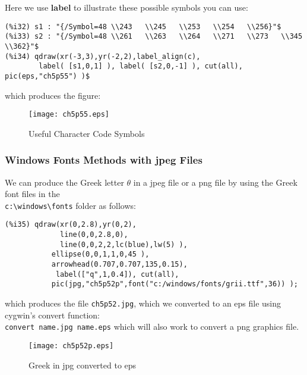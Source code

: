 \documentclass[12pt]{article}
\begin{document}
\smallskip

Here we use \textbf{label} to illustrate these possible symbols you can use:
\small
\begin{verbatim}
(%i32) s1 : "{/Symbol=48 \\243   \\245   \\253   \\254   \\256}"$
(%i33) s2 : "{/Symbol=48 \\261   \\263   \\264   \\271   \\273   \\345   \\362}"$
(%i34) qdraw(xr(-3,3),yr(-2,2),label_align(c),
        label( [s1,0,1] ), label( [s2,0,-1] ), cut(all), pic(eps,"ch5p55") )$
\end{verbatim}
\normalsize
which produces the figure:
\begin{figure} [h]
   \centerline{\texttt{[image: ch5p55.eps]} }
	\caption{Useful Character Code Symbols}
\end{figure}      



\newpage
\subsubsection{Windows Fonts Methods with jpeg Files}
We can produce the Greek letter $\theta$ in a jpeg file or a png file by using
  the Greek font files in the\\
  \verb|c:\windows\fonts| folder as follows:  
\small
\begin{verbatim}
(%i35) qdraw(xr(0,2.8),yr(0,2),
             line(0,0,2.8,0),
             line(0,0,2,2,lc(blue),lw(5) ),
           ellipse(0,0,1,1,0,45 ),
           arrowhead(0.707,0.707,135,0.15),
            label(["q",1,0.4]), cut(all),
           pic(jpg,"ch5p52p",font("c:/windows/fonts/grii.ttf",36)) );  
\end{verbatim}
\normalsize
which produces the file \verb|ch5p52.jpg|, which we converted to an eps
  file using cygwin's convert function:\\
  \verb|convert name.jpg name.eps| which will also work to convert a png graphics file.

\begin{figure} [h]
   \centerline{\texttt{[image: ch5p52p.eps]} }
	\caption{Greek in jpg converted to eps}
\end{figure}      
\end{document}
